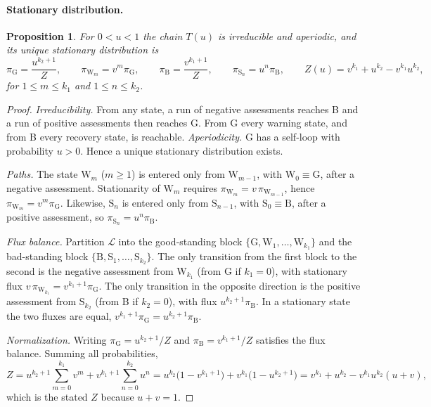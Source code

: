 \documentclass[fleqn,10pt]{wlscirep}
\newcommand{\Lspace}{\mathscr{L}}          %
\newcommand{\st}[1]{\mathrm{#1}}           %
\theoremstyle{plain}
\newtheorem{proposition}[lemma]{Proposition}
\begin{document}
\paragraph{Stationary distribution.}
\begin{proposition}\label{prop:stationary}
For $0<u<1$ the chain $T(u)$ is irreducible and aperiodic, and its unique stationary distribution is
\begin{equation}
\pi_{\st G}=\frac{u^{k_2+1}}{Z},\qquad \pi_{\st W_m}=v^m\pi_{\st G},\qquad \pi_{\st B}=\frac{v^{k_1+1}}{Z},\qquad \pi_{\st S_n}=u^n\pi_{\st B},\qquad Z(u)=v^{k_1}+u^{k_2}-v^{k_1}u^{k_2},
\label{eq:s-stationary}
\end{equation}
for $1\leq m\leq k_1$ and $1\leq n\leq k_2$.
\end{proposition}
\begin{proof}
\textit{Irreducibility.} From any state, a run of negative assessments reaches B and a run of positive assessments then reaches G. From G every warning state, and from B every recovery state, is reachable. \textit{Aperiodicity.} G has a self-loop with probability $u>0$. Hence a unique stationary distribution exists.

\textit{Paths.} The state $\st W_m$ ($m\geq1$) is entered only from $\st W_{m-1}$, with $\st W_0\equiv\st G$, after a negative assessment. Stationarity of $\st W_m$ requires $\pi_{\st W_m}=v\,\pi_{\st W_{m-1}}$, hence $\pi_{\st W_m}=v^m\pi_{\st G}$. Likewise, $\st S_n$ is entered only from $\st S_{n-1}$, with $\st S_0\equiv\st B$, after a positive assessment, so $\pi_{\st S_n}=u^n\pi_{\st B}$.

\textit{Flux balance.} Partition $\Lspace$ into the good-standing block $\{\st G,\st W_1,\ldots,\st W_{k_1}\}$ and the bad-standing block $\{\st B,\st S_1,\ldots,\st S_{k_2}\}$. The only transition from the first block to the second is the negative assessment from $\st W_{k_1}$ (from G if $k_1=0$), with stationary flux $v\,\pi_{\st W_{k_1}}=v^{k_1+1}\pi_{\st G}$. The only transition in the opposite direction is the positive assessment from $\st S_{k_2}$ (from B if $k_2=0$), with flux $u^{k_2+1}\pi_{\st B}$. In a stationary state the two fluxes are equal, $v^{k_1+1}\pi_{\st G}=u^{k_2+1}\pi_{\st B}$.

\textit{Normalization.} Writing $\pi_{\st G}=u^{k_2+1}/Z$ and $\pi_{\st B}=v^{k_1+1}/Z$ satisfies the flux balance. Summing all probabilities,
\begin{equation*}
Z=u^{k_2+1}\sum_{m=0}^{k_1}v^m+v^{k_1+1}\sum_{n=0}^{k_2}u^n
=u^{k_2}\bigl(1-v^{k_1+1}\bigr)+v^{k_1}\bigl(1-u^{k_2+1}\bigr)
=v^{k_1}+u^{k_2}-v^{k_1}u^{k_2}(u+v),
\end{equation*}
which is the stated $Z$ because $u+v=1$.
\end{proof}
\end{document}
